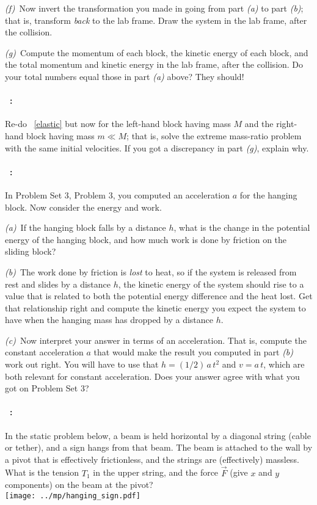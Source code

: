 \documentclass[12pt]{article}
\begin{document}
\textsl{(f)}~Now invert the transformation you made in going from part
\textsl{(a)} to part \textsl{(b)}; that is, transform \emph{back} to
the lab frame. Draw the system in the lab frame, after the collision.

\textsl{(g)}~Compute the momentum of each block, the kinetic energy of
each block, and the total momentum and kinetic energy in the lab
frame, after the collision. Do your total numbers equal those in part
\textsl{(a)} above? They should!

\paragraph{\problemname~\theproblem:}%
Re-do \problemname~\ref{elastic}
but now for the left-hand block having
mass $M$ and the right-hand block having mass $m\ll M$; that is, solve
the extreme mass-ratio problem with the same initial velocities.
If you got a discrepancy in part \textsl{(g)}, explain why.

\paragraph{\problemname~\theproblem:}\label{blocks}%
In Problem Set 3, Problem 3, you computed an acceleration $a$ for the
hanging block. Now consider the energy and work.

\textsl{(a)}~If the hanging block falls by a distance $h$, what is
the change in the potential energy of the hanging block, and how much
work is done by friction on the sliding block?

\textsl{(b)}~The work done by friction is \emph{lost} to heat, so if
the system is released from rest and slides by a distance $h$, the
kinetic energy of the system should rise to a value that is related to both the
potential energy difference and the heat lost. Get that relationship
right and compute the kinetic energy you expect the system to have
when the hanging mass has dropped by a distance $h$.

\textsl{(c)}~Now interpret your answer in terms of an acceleration.
That is, compute the constant acceleration $a$ that would make the
result you computed in part \textsl{(b)} work out right. You will have
to use that $h = (1/2)\,a\,t^2$ and $v=a\,t$, which are both relevant
for constant acceleration. Does your answer agree with what you got on
Problem Set 3?

\paragraph{\problemname~\theproblem:}%
In the static problem below, a beam is held horizontal by a diagonal
string (cable or tether), and a sign hangs from that beam. The beam is
attached to the wall by a pivot that is effectively frictionless, and
the strings are (effectively) massless. What is the tension $T_1$ in
the upper string, and the force $\vec{F}$ (give $x$ and $y$
components) on the beam at the pivot?
\\ \texttt{[image: ../mp/hanging\_sign.pdf]}
\end{document}
